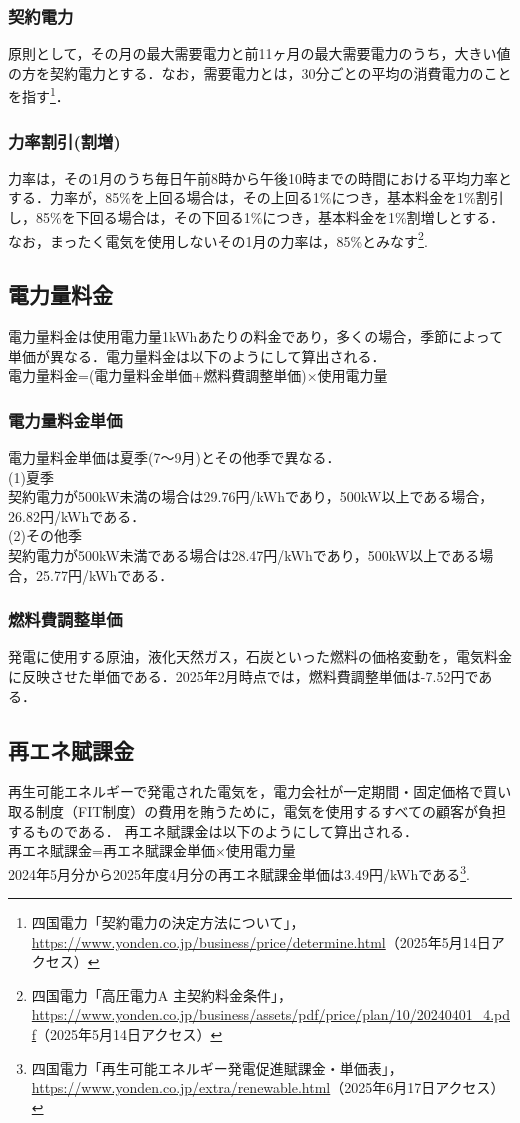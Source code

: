 \documentclass{jarticle}
\begin{document}
\subsubsection{契約電力}
原則として，その月の最大需要電力と前11ヶ月の最大需要電力のうち，大きい値の方を契約電力とする．なお，需要電力とは，30分ごとの平均の消費電力のことを指す\footnote{四国電力「契約電力の決定方法について」，\url{https://www.yonden.co.jp/business/price/determine.html}（2025年5月14日アクセス）}．
\subsubsection{力率割引(割増)}
力率は，その1月のうち毎日午前8時から午後10時までの時間における平均力率とする．力率が，85\%を上回る場合は，その上回る1\%につき，基本料金を1\%割引し，85\%を下回る場合は，その下回る1\%につき，基本料金を1\%割増しとする．なお，まったく電気を使用しないその1月の力率は，85\%とみなす\footnote{四国電力「高圧電力A 主契約料金条件」，\url{https://www.yonden.co.jp/business/assets/pdf/price/plan/10/20240401_4.pdf}（2025年5月14日アクセス）}.

\subsection{電力量料金}
電力量料金は使用電力量1kWhあたりの料金であり，多くの場合，季節によって単価が異なる．電力量料金は以下のようにして算出される．\\
電力量料金=(電力量料金単価+燃料費調整単価)×使用電力量
\subsubsection{電力量料金単価} 
電力量料金単価は夏季(7〜9月)とその他季で異なる．\\
(1)夏季\\
契約電力が500kW未満の場合は29.76円/kWhであり，500kW以上である場合，26.82円/kWhである．\\
(2)その他季\\
契約電力が500kW未満である場合は28.47円/kWhであり，500kW以上である場合，25.77円/kWhである．
\subsubsection{燃料費調整単価}
発電に使用する原油，液化天然ガス，石炭といった燃料の価格変動を，電気料金に反映させた単価である．2025年2月時点では，燃料費調整単価は-7.52円である．

\subsection{再エネ賦課金}
再生可能エネルギーで発電された電気を，電力会社が一定期間・固定価格で買い取る制度（FIT制度）の費用を賄うために，電気を使用するすべての顧客が負担するものである．
再エネ賦課金は以下のようにして算出される．\\
再エネ賦課金=再エネ賦課金単価×使用電力量\\
2024年5月分から2025年度4月分の再エネ賦課金単価は3.49円/kWhである\footnote{四国電力「再生可能エネルギー発電促進賦課金・単価表」，\url{https://www.yonden.co.jp/extra/renewable.html}（2025年6月17日アクセス）}.
\end{document}
